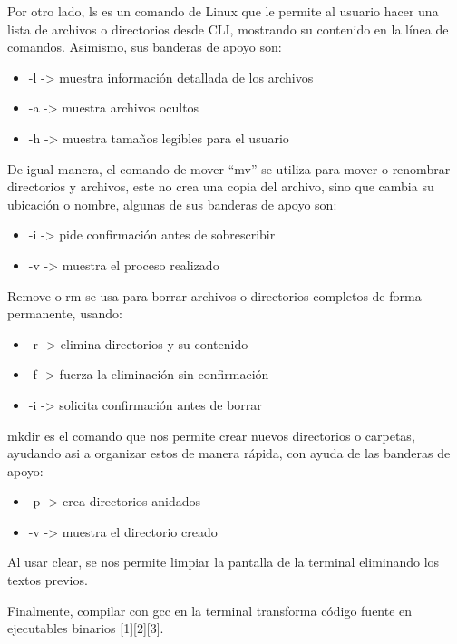 \documentclass[letterpaper,12pt,oneside]{article}
\begin{document}
Por otro lado, ls es un comando de Linux que le permite al usuario hacer una lista de archivos o directorios desde CLI, mostrando su contenido en la línea de comandos. Asimismo, sus banderas de apoyo son:

\begin{itemize}
    \item -l -> muestra información detallada de los archivos
    \item -a -> muestra archivos ocultos
    \item -h -> muestra tamaños legibles para el usuario
\end{itemize}

De igual manera, el comando de mover “mv” se utiliza para mover o renombrar directorios y archivos, este no crea una copia del archivo, sino que cambia su ubicación o nombre, algunas de sus banderas de apoyo son:

\begin{itemize}
    \item -i -> pide confirmación antes de sobrescribir
    \item -v -> muestra el proceso realizado
\end{itemize}

Remove o rm se usa para borrar archivos o directorios completos de forma permanente, usando:

\begin{itemize}
    \item -r -> elimina directorios y su contenido
    \item -f -> fuerza la eliminación sin confirmación
    \item -i -> solicita confirmación antes de borrar
\end{itemize}

mkdir es el comando que nos permite crear nuevos directorios o carpetas, ayudando asi a organizar estos de manera rápida, con ayuda de las banderas de apoyo:

\begin{itemize}
    \item -p -> crea directorios anidados
    \item -v -> muestra el directorio creado
\end{itemize}

Al usar clear, se nos permite limpiar la pantalla de la terminal eliminando los textos previos.

Finalmente, compilar con gcc en la terminal transforma código fuente en ejecutables binarios [1][2][3].
\end{document}
